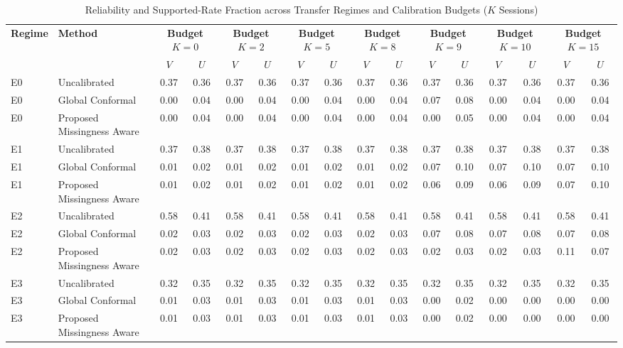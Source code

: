 \begin{table}[t]
\centering
\caption{Reliability and Supported-Rate Fraction across Transfer Regimes and Calibration Budgets ($K$ Sessions)}
\label{tab:main_benchmark}
\begin{tabular}{llcccccccccccccc}
\hline
\textbf{Regime} & \textbf{Method} & \multicolumn{2}{c}{\textbf{Budget $K=0$}} & \multicolumn{2}{c}{\textbf{Budget $K=2$}} & \multicolumn{2}{c}{\textbf{Budget $K=5$}} & \multicolumn{2}{c}{\textbf{Budget $K=8$}} & \multicolumn{2}{c}{\textbf{Budget $K=9$}} & \multicolumn{2}{c}{\textbf{Budget $K=10$}} & \multicolumn{2}{c}{\textbf{Budget $K=15$}} \\
 & & $V$ & $U$ & $V$ & $U$ & $V$ & $U$ & $V$ & $U$ & $V$ & $U$ & $V$ & $U$ & $V$ & $U$ \\
\hline
E0 & Uncalibrated & 0.37 & 0.36 & 0.37 & 0.36 & 0.37 & 0.36 & 0.37 & 0.36 & 0.37 & 0.36 & 0.37 & 0.36 & 0.37 & 0.36 \\
E0 & Global Conformal & 0.00 & 0.04 & 0.00 & 0.04 & 0.00 & 0.04 & 0.00 & 0.04 & 0.07 & 0.08 & 0.00 & 0.04 & 0.00 & 0.04 \\
E0 & Proposed Missingness Aware & 0.00 & 0.04 & 0.00 & 0.04 & 0.00 & 0.04 & 0.00 & 0.04 & 0.00 & 0.05 & 0.00 & 0.04 & 0.00 & 0.04 \\
\hline
E1 & Uncalibrated & 0.37 & 0.38 & 0.37 & 0.38 & 0.37 & 0.38 & 0.37 & 0.38 & 0.37 & 0.38 & 0.37 & 0.38 & 0.37 & 0.38 \\
E1 & Global Conformal & 0.01 & 0.02 & 0.01 & 0.02 & 0.01 & 0.02 & 0.01 & 0.02 & 0.07 & 0.10 & 0.07 & 0.10 & 0.07 & 0.10 \\
E1 & Proposed Missingness Aware & 0.01 & 0.02 & 0.01 & 0.02 & 0.01 & 0.02 & 0.01 & 0.02 & 0.06 & 0.09 & 0.06 & 0.09 & 0.07 & 0.10 \\
\hline
E2 & Uncalibrated & 0.58 & 0.41 & 0.58 & 0.41 & 0.58 & 0.41 & 0.58 & 0.41 & 0.58 & 0.41 & 0.58 & 0.41 & 0.58 & 0.41 \\
E2 & Global Conformal & 0.02 & 0.03 & 0.02 & 0.03 & 0.02 & 0.03 & 0.02 & 0.03 & 0.07 & 0.08 & 0.07 & 0.08 & 0.07 & 0.08 \\
E2 & Proposed Missingness Aware & 0.02 & 0.03 & 0.02 & 0.03 & 0.02 & 0.03 & 0.02 & 0.03 & 0.02 & 0.03 & 0.02 & 0.03 & 0.11 & 0.07 \\
\hline
E3 & Uncalibrated & 0.32 & 0.35 & 0.32 & 0.35 & 0.32 & 0.35 & 0.32 & 0.35 & 0.32 & 0.35 & 0.32 & 0.35 & 0.32 & 0.35 \\
E3 & Global Conformal & 0.01 & 0.03 & 0.01 & 0.03 & 0.01 & 0.03 & 0.01 & 0.03 & 0.00 & 0.02 & 0.00 & 0.00 & 0.00 & 0.00 \\
E3 & Proposed Missingness Aware & 0.01 & 0.03 & 0.01 & 0.03 & 0.01 & 0.03 & 0.01 & 0.03 & 0.00 & 0.02 & 0.00 & 0.00 & 0.00 & 0.00 \\
\hline
\end{tabular}
\end{table}